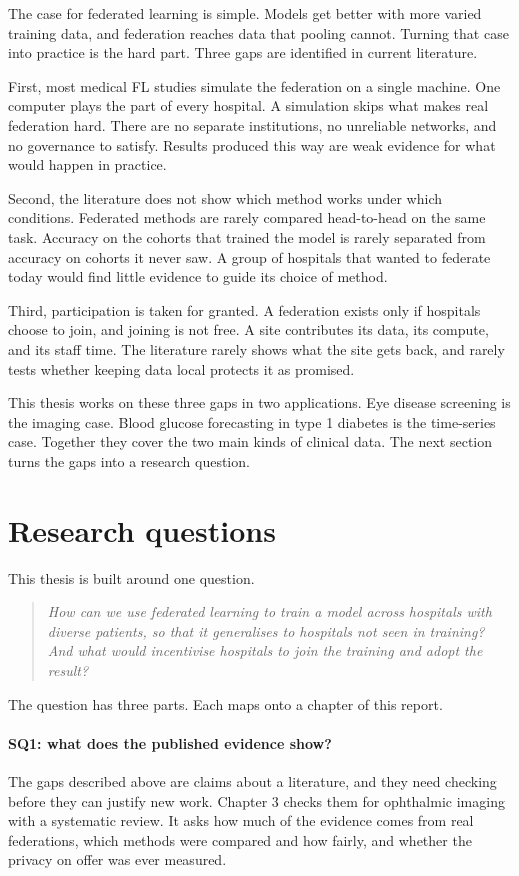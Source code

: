 The case for federated learning is simple. Models get better with more varied training data, and federation reaches data that pooling cannot. Turning that case into practice is the hard part. Three gaps are identified in current literature.

First, most medical FL studies simulate the federation on a single machine. One computer plays the part of every hospital. A simulation skips what makes real federation hard. There are no separate institutions, no unreliable networks, and no governance to satisfy. Results produced this way are weak evidence for what would happen in practice.

Second, the literature does not show which method works under which conditions. Federated methods are rarely compared head-to-head on the same task. Accuracy on the cohorts that trained the model is rarely separated from accuracy on cohorts it never saw. A group of hospitals that wanted to federate today would find little evidence to guide its choice of method.

Third, participation is taken for granted. A federation exists only if hospitals choose to join, and joining is not free. A site contributes its data, its compute, and its staff time. The literature rarely shows what the site gets back, and rarely tests whether keeping data local protects it as promised.

This thesis works on these three gaps in two applications. Eye disease screening is the imaging case. Blood glucose forecasting in type 1 diabetes is the time-series case. Together they cover the two main kinds of clinical data. The next section turns the gaps into a research question.

\section{Research questions}
\label{sec:intro-rq}

This thesis is built around one question.

\begin{quote}
\itshape How can we use federated learning to train a model across hospitals with diverse patients, so that it generalises to hospitals not seen in training? And what would incentivise hospitals to join the training and adopt the result?
\end{quote}

The question has three parts. Each maps onto a chapter of this report.

\paragraph{SQ1: what does the published evidence show?} The gaps described above are claims about a literature, and they need checking before they can justify new work. Chapter 3 checks them for ophthalmic imaging with a systematic review. It asks how much of the evidence comes from real federations, which methods were compared and how fairly, and whether the privacy on offer was ever measured.

